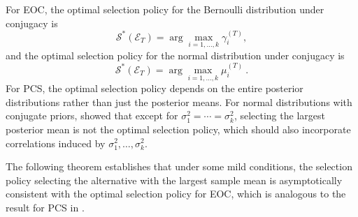 \documentclass[journal]{IEEEtran}
\begin{document}
  For EOC, the optimal selection policy for the Bernoulli distribution under conjugacy is 
   $$\mathcal{S}^{*}(\mathcal{E}_T)=\arg\max_{i=1,\ldots,k} \gamma_i^{(T)},$$  
   and the optimal selection policy for the normal distribution under conjugacy is 
   $$\mathcal{S}^{*}(\mathcal{E}_T)=\arg\max_{i=1,\ldots,k} \mu_i^{(T)}~.$$  
    For PCS, the optimal selection policy depends on the entire posterior distributions rather than just the posterior means. 
    For normal distributions with conjugate priors, \cite{peng2014dynamic} showed that except for $\sigma_1^2=\cdots=\sigma_k^2$, selecting the largest posterior mean is not the optimal selection policy, which should also incorporate correlations induced by $\sigma_1^2,\ldots,\sigma_k^2$. 
    
    The following theorem establishes that under some mild conditions, the selection policy selecting the alternative with the largest sample mean is asymptotically consistent with the optimal selection policy for EOC, which is analogous to the result for PCS in  \cite{peng2014dynamic}. 
    
\end{document}
